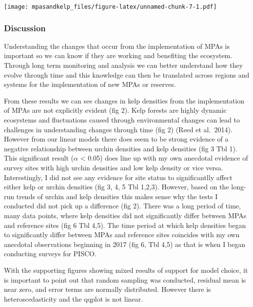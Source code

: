\documentclass[
]{article}
\begin{document}
\texttt{[image: mpasandkelp\_files/figure-latex/unnamed-chunk-7-1.pdf]}

\hypertarget{discussion}{%
\subsubsection{Discussion}\label{discussion}}

Understanding the changes that occur from the implementation of MPAs is
important so we can know if they are working and benefiting the
ecosystem. Through long term monitoring and analysis we can better
understand how they evolve through time and this knowledge can then be
translated across regions and systems for the implementation of new MPAs
or reserves.

From these results we can see changes in kelp densities from the
implementation of MPAs are not explicitly evident (fig 2). Kelp forests
are highly dynamic ecosystems and fluctuations caused through
environmental changes can lead to challenges in understanding changes
through time (fig 2) (Reed et al.~2014). However from our linear models
there does seem to be strong evidence of a negative relationship between
urchin densities and kelp densities (fig 3 Tbl 1). This significant
result (\(\alpha\) \textless{} 0.05) does line up with my own anecdotal
evidence of survey sites with high urchin densities and low kelp density
or vice versa. Interestingly, I did not see any evidence for site status
to significantlly affect either kelp or urchin densities (fig 3, 4, 5
Tbl 1,2,3). However, based on the long-run trends of urchin and kelp
densities this makes sense why the tests I conducted did not pick up a
difference (fig 2). There was a long period of time, many data points,
where kelp densities did not significantly differ between MPAs and
reference sites (fig 6 Tbl 4,5). The time period at which kelp densities
began to significantly differ between MPAs and reference sites coincides
with my own anecdotal observations beginning in 2017 (fig 6, Tbl 4,5) as
that is when I began conducting surveys for PISCO.

With the supporting figures showing mixed results of support for model
choice, it is important to point out that random sampling was conducted,
residual mean is near zero, and error terms are normally distributed.
However there is heteroscedasticity and the qqplot is not linear.
\end{document}
